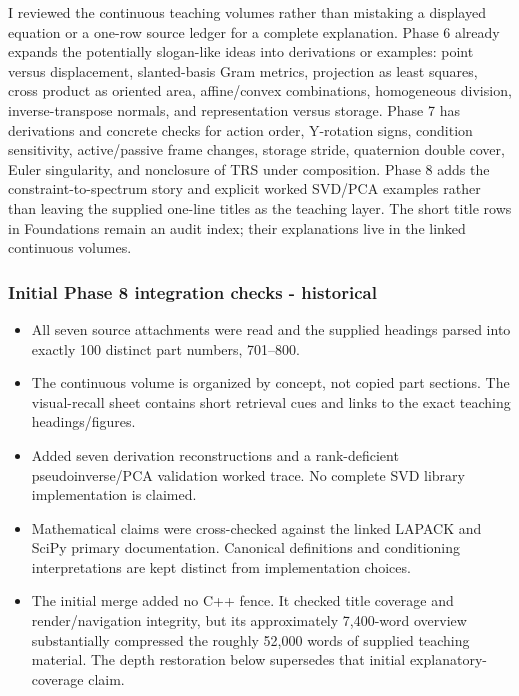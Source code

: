 I reviewed the continuous teaching volumes rather than mistaking a displayed equation or a one-row source ledger for a complete explanation. Phase 6 already expands the potentially slogan-like ideas into derivations or examples: point versus displacement, slanted-basis Gram metrics, projection as least squares, cross product as oriented area, affine/convex combinations, homogeneous division, inverse-transpose normals, and representation versus storage. Phase 7 has derivations and concrete checks for action order, Y-rotation signs, condition sensitivity, active/passive frame changes, storage stride, quaternion double cover, Euler singularity, and nonclosure of TRS under composition. Phase 8 adds the constraint-to-spectrum story and explicit worked SVD/PCA examples rather than leaving the supplied one-line titles as the teaching layer. The short title rows in Foundations remain an audit index; their explanations live in the linked continuous volumes.

\subsubsection{Initial Phase 8 integration checks - historical}\label{appendix-a103e7846d21-initial-phase-8-integration-checks---historical}

\begin{itemize}
\tightlist
\item
  All seven source attachments were read and the supplied headings parsed into exactly 100 distinct part numbers, 701--800.
\item
  The continuous volume is organized by concept, not copied part sections. The visual-recall sheet contains short retrieval cues and links to the exact teaching headings/figures.
\item
  Added seven derivation reconstructions and a rank-deficient pseudoinverse/PCA validation worked trace. No complete SVD library implementation is claimed.
\item
  Mathematical claims were cross-checked against the linked LAPACK and SciPy primary documentation. Canonical definitions and conditioning interpretations are kept distinct from implementation choices.
\item
  The initial merge added no C++ fence. It checked title coverage and render/navigation integrity, but its approximately 7,400-word overview substantially compressed the roughly 52,000 words of supplied teaching material. The depth restoration below supersedes that initial explanatory-coverage claim.
\end{itemize}

